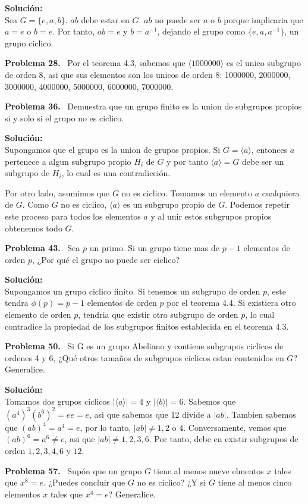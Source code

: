 \documentclass{article}
\newcounter{problem}
\newcounter{solution}
\newcommand\Problem[1]{%
  \stepcounter{problem}%
  \textbf{Problema #1.}~%
  \setcounter{solution}{0}%
}
\newcommand\TheSolution{%
  \textbf{Solución:}\\%
}
\begin{document}
\TheSolution{}
Sea $G = \{e, a, b\}$. $ab$ debe estar en $G$. $ab$ no puede ser $a$ o $b$
porque implicaria que $a = e$ o $b = e$. Por tanto, $ab = e$ y $b = a^{-1}$,
dejando el grupo como $\{e, a, a^{-1}\}$, un grupo ciclico.

\Problem{28} Por el teorema 4.3, sabemos que $\langle 1000000\rangle$ es el
unico subgrupo de orden 8, asi que sus elementos son los unicos de orden 8:
1000000, 2000000, 3000000, 4000000, 5000000, 6000000, 7000000.

\Problem{36} Demuestra que un grupo finito es la union de subgrupos propios si
y solo si el grupo no es ciclico.

\TheSolution{}
Supongamos que el grupo es la union de grupos propios. Si $G = \langle
a\rangle$, entonces $a$ pertenece a algun subgrupo propio $H_i$ de $G$ y
por tanto $\langle a \rangle = G$ debe ser un subgrupo de $H_i$, lo cual es
una contradicción.

Por otro lado, asumimos que $G$ no es ciclico. Tomamos un elemento $a$
cualquiera de $G$. Como $G$ no es ciclico, $\langle a \rangle$ es un subgrupo
propio de $G$. Podemos repetir este proceso para todos los elementos $a$ y
al unir estos subgrupos propios obtenemos todo $G$.

\Problem{43} Sea $p$ un primo. Si un grupo tiene mas de $p - 1$ elementos de
orden $p$, ¿Por qué el grupo no puede ser ciclico?

\TheSolution{}
Supongamos un grupo ciclico finito. Si tenemos un subgrupo de orden
$p$, este tendra $\phi(p) = p - 1$ elementos de orden $p$ por el teorema 4.4.
Si existiera otro elemento de orden $p$, tendria que existir otro subgrupo de
orden $p$, lo cual contradice la propiedad de los subgrupos finitos
establecida en el teorema 4.3.

\Problem{50} Si G es un grupo Abeliano y contiene subgrupos ciclicos de
ordenes 4 y 6, ¿Qué otros tamaños de subgrupos ciclicos estan contenidos en
$G$? Generalice.

\TheSolution{} Tomamos dos grupos ciclicos $|\langle a \rangle| = 4$ y
$|\langle b\rangle| = 6$. Sabemos que ${(a^4)}^{3}{(b^6)}^2 = ee = e$, asi que
sabemos que 12 divide a $|ab|$. Tambien sabemos que ${(ab)}^{4} = a^4 = e$,
por lo tanto, $|ab| \neq 1, 2$ o $4$. Conversamente, vemos que ${(ab)}^{6} =
a^{6} \neq e$, asi que $|ab| \neq 1, 2, 3, 6$. Por tanto, debe en existir
subgrupos de orden $1, 2, 3, 4, 6$ y $12$.

\Problem{57} Supón que un grupo $G$ tiene al menos nueve elmentos $x$ tales
que $x^8 = e$. ¿Puedes concluir que $G$ no es ciclico? ¿Y si $G$ tiene al
menos cinco elementos $x$ tales que $x^4 = e$? Generalice.
\end{document}
